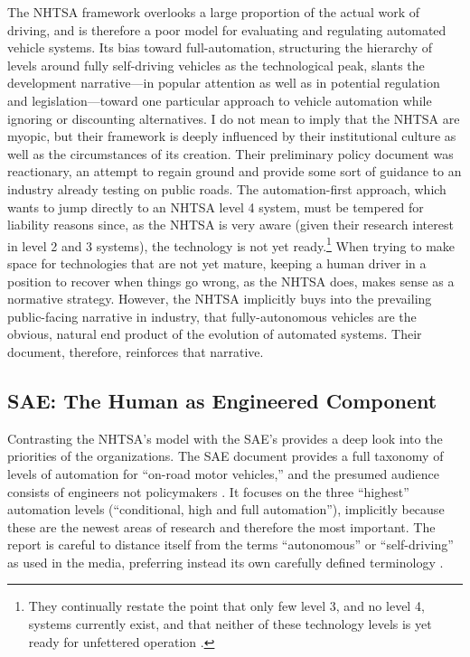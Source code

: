 The NHTSA framework overlooks a large proportion of the actual work of
driving, and is therefore a poor model for evaluating and
regulating automated vehicle systems. Its bias toward
full-automation, structuring the hierarchy of levels around fully
self-driving vehicles as the technological peak, slants the
development narrative---in popular attention as well as in
potential regulation and legislation---toward one particular approach
to vehicle automation while ignoring or discounting alternatives. I do
not mean to imply that the NHTSA are myopic, but their framework is
deeply influenced by their institutional culture as well as the
circumstances of its creation. Their preliminary policy document was
reactionary, an attempt to regain ground and provide some sort of guidance to an
industry already testing on public roads. The automation-first
approach, which wants to jump directly to an NHTSA level 4 system,
must be tempered for liability reasons since, as the 
NHTSA is very aware (given their research interest in level 2 and 3
systems), the technology is not yet ready.\footnote{They continually
  restate the point that only few level 3, and no level 4, systems
  currently exist, and that neither of these technology levels is yet
  ready for unfettered operation \cite[p. 10, 14]{NHTSA}.} When trying to make space for
technologies that are not yet mature, keeping a human driver in a
position to recover when things go wrong, as the NHTSA does, makes sense as a normative
strategy. However, the NHTSA implicitly buys into the prevailing
public-facing narrative in industry, that fully-autonomous vehicles
are the obvious, natural end product of the evolution of automated
systems. Their document, therefore, reinforces that narrative.

\subsection{SAE: The Human as Engineered Component}

Contrasting the NHTSA's model with the SAE's provides a deep look into
the priorities of the organizations. The SAE document provides a full
taxonomy of levels of automation for ``on-road motor vehicles,'' and the
presumed audience consists of engineers not policymakers \cite{SAE}. It
focuses on the three ``highest'' automation levels (``conditional, high
and full automation''), implicitly because these are the newest areas
of research and therefore the most important. The report is careful to
distance itself from the terms ``autonomous'' or ``self-driving'' as used
in the media, preferring instead its own carefully defined
terminology \cite[p. 5-6]{SAE}. 

